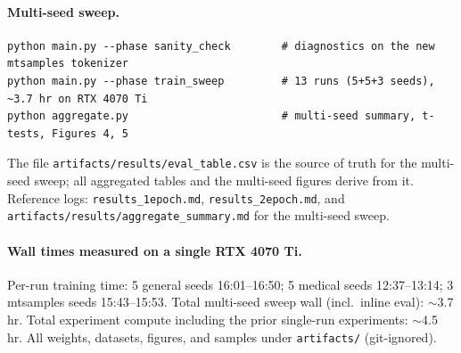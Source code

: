 \documentclass[11pt]{article}
\begin{document}
\paragraph{Multi-seed sweep.}

\begin{verbatim}
python main.py --phase sanity_check        # diagnostics on the new mtsamples tokenizer
python main.py --phase train_sweep         # 13 runs (5+5+3 seeds), ~3.7 hr on RTX 4070 Ti
python aggregate.py                        # multi-seed summary, t-tests, Figures 4, 5
\end{verbatim}

The file \texttt{artifacts/results/eval\_table.csv} is the source of truth for the multi-seed sweep; all aggregated tables and the multi-seed figures derive from it. Reference logs: \texttt{results\_1epoch.md}, \texttt{results\_2epoch.md}, and \texttt{artifacts/results/aggregate\_summary.md} for the multi-seed sweep.

\paragraph{Wall times measured on a single RTX 4070 Ti.}
Per-run training time: 5 general seeds 16:01--16:50; 5 medical seeds 12:37--13:14; 3 mtsamples seeds 15:43--15:53. Total multi-seed sweep wall (incl.\ inline eval): $\sim$3.7 hr. Total experiment compute including the prior single-run experiments: $\sim$4.5 hr. All weights, datasets, figures, and samples under \texttt{artifacts/} (git-ignored).
\end{document}
